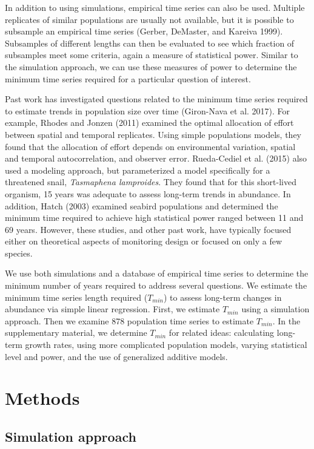 \documentclass[12pt,]{article}
\begin{document}
In addition to using simulations, empirical time series can also be
used. Multiple replicates of similar populations are usually not
available, but it is possible to subsample an empirical time series
(Gerber, DeMaster, and Kareiva 1999). Subsamples of different lengths
can then be evaluated to see which fraction of subsamples meet some
criteria, again a measure of statistical power. Similar to the
simulation approach, we can use these measures of power to determine the
minimum time series required for a particular question of interest.

Past work has investigated questions related to the minimum time series
required to estimate trends in population size over time (Giron-Nava et
al. 2017). For example, Rhodes and Jonzen (2011) examined the optimal
allocation of effort between spatial and temporal replicates. Using
simple populations models, they found that the allocation of effort
depends on environmental variation, spatial and temporal
autocorrelation, and observer error. Rueda-Cediel et al. (2015) also
used a modeling approach, but parameterized a model specifically for a
threatened snail, \emph{Tasmaphena lamproides}. They found that for this
short-lived organism, 15 years was adequate to assess long-term trends
in abundance. In addition, Hatch (2003) examined seabird populations and
determined the minimum time required to achieve high statistical power
ranged between 11 and 69 years. However, these studies, and other past
work, have typically focused either on theoretical aspects of monitoring
design or focused on only a few species.

We use both simulations and a database of empirical time series to
determine the minimum number of years required to address several
questions. We estimate the minimum time series length required
(\(T_{min}\)) to assess long-term changes in abundance via simple linear
regression. First, we estimate \(T_{min}\) using a simulation approach.
Then we examine 878 population time series to estimate \(T_{min}\). In
the supplementary material, we determine \(T_{min}\) for related ideas:
calculating long-term growth rates, using more complicated population
models, varying statistical level and power, and the use of generalized
additive models.

\section{Methods}\label{methods}

\subsection{Simulation approach}\label{simulation-approach}
\end{document}
